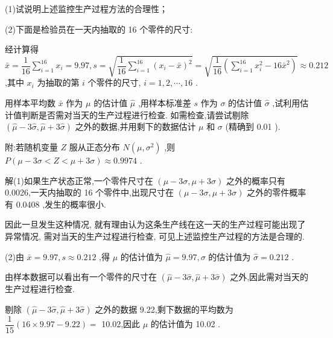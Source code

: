 (1)试说明上述监控生产过程方法的合理性；

(2)下面是检验员在一天内抽取的 16 个零件的尺寸:

\begin{center}
\end{center}

经计算得 $\bar{x} = \dfrac{1}{16}\mathop{\sum }\limits_{{i = 1}}^{{16}}{x}_{i} = {9.97},s = \sqrt{\dfrac{1}{16}\mathop{\sum }\limits_{{i = 1}}^{{16}}{\left( {x}_{i} - \bar{x}\right) }^{2}} = \sqrt{\dfrac{1}{16}\left( {\mathop{\sum }\limits_{{i = 1}}^{{16}}{x}_{i}^{2} - {16}{\bar{x}}^{2}}\right) } \approx  {0.212}$ ,其中 ${x}_{i}$ 为抽取的第 $i$ 个零件的尺寸, $i = 1,2,\cdots ,{16}$ .

用样本平均数 $\bar{x}$ 作为 $\mu$ 的估计值 $\widehat{\mu }$ ,用样本标准差 $s$ 作为 $\sigma$ 的估计值 $\widehat{\sigma }$ ,试利用估计值判断是否需对当天的生产过程进行检查. 如需检查,请尝试剔除 $\left( {\widehat{\mu } - 3\widehat{\sigma },\widehat{\mu } + 3\widehat{\sigma }}\right)$ 之外的数据,并用剩下的数据估计 $\mu$ 和 $\sigma$ (精确到 0.01 ).

附:若随机变量 $Z$ 服从正态分布 $N\left( {\mu ,{\sigma }^{2}}\right)$ ,则 $P\left( {\mu  - {3\sigma } < Z < \mu  + {3\sigma }}\right)  \approx  {0.9974}$ .

解(1)如果生产状态正常,一个零件尺寸在 $\left( {\mu  - {3\sigma },\mu  + {3\sigma }}\right)$ 之外的概率只有 0.0026,一天内抽取的 16 个零件中,出现尺寸在 $\left( {\mu  - {3\sigma },\mu  + {3\sigma }}\right)$ 之外的零件概率有 0.0408 ,发生的概率很小.

因此一旦发生这种情况, 就有理由认为这条生产线在这一天的生产过程可能出现了异常情况, 需对当天的生产过程进行检查, 可见上述监控生产过程的方法是合理的.

(2)由 $\bar{x} = {9.97},s \approx  {0.212}$ ,得 $\mu$ 的估计值为 $\widehat{\mu } = {9.97},\sigma$ 的估计值为 $\widehat{\sigma } = {0.212}$ .

由样本数据可以看出有一个零件的尺寸在 $\left( {\widehat{\mu } - 3\widehat{\sigma },\widehat{\mu } + 3\widehat{\sigma }}\right)$ 之外,因此需对当天的生产过程进行检查.

剔除 $\left( {\widehat{\mu } - 3\widehat{\sigma },\widehat{\mu } + 3\widehat{\sigma }}\right)$ 之外的数据 9.22,剩下数据的平均数为 $\dfrac{1}{15}\left( {{16} \times  {9.97} - {9.22}}\right)  =$ 10.02,因此 $\mu$ 的估计值为 10.02 .

